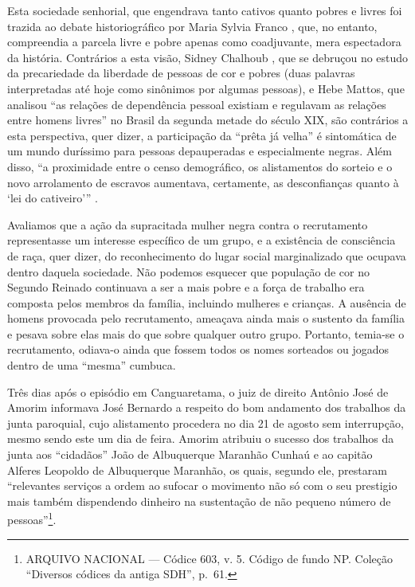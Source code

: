 \begin{refsection}
Esta sociedade senhorial, que engendrava tanto cativos quanto pobres e livres foi trazida ao debate historiográfico por Maria Sylvia Franco \citeyear{Franco1997}, que, no entanto, compreendia a parcela livre e pobre apenas como coadjuvante, mera espectadora da história. Contrários a esta visão, Sidney Chalhoub \citeyear{Chalhoub1990}, que se debruçou no estudo da precariedade da liberdade de pessoas de cor e pobres (duas palavras interpretadas até hoje como sinônimos por algumas pessoas), e Hebe Mattos, que analisou “as relações de dependência pessoal existiam e regulavam as relações entre homens livres” \cite[p.~89]{Mattos1987} no Brasil da segunda metade do século XIX, são contrários a esta perspectiva, quer dizer, a participação da “prêta já velha” é sintomática de um mundo duríssimo para pessoas depauperadas e especialmente negras. Além disso, “a proximidade entre o censo demográfico, os alistamentos do sorteio e o novo arrolamento de escravos aumentava, certamente, as desconfianças quanto à ‘lei do cativeiro’” \cite[p.~271]{Mendes1999}.

Avaliamos que a ação da supracitada mulher negra contra o recrutamento representasse um interesse específico de um grupo, e a existência de consciência de raça, quer dizer, do reconhecimento do lugar social marginalizado que ocupava dentro daquela sociedade. Não podemos esquecer que população de cor no Segundo Reinado continuava a ser a mais pobre e a força de trabalho era composta pelos membros da família, incluindo mulheres e crianças. A ausência de homens provocada pelo recrutamento, ameaçava ainda mais o sustento da família e pesava sobre elas mais do que sobre qualquer outro grupo. Portanto, temia-se o recrutamento, odiava-o ainda que fossem todos os nomes sorteados ou jogados dentro de uma “mesma” cumbuca.  

Três dias após o episódio em Canguaretama, o juiz de direito Antônio José de Amorim informava José Bernardo a respeito do bom andamento dos trabalhos da junta paroquial, cujo alistamento procedera no dia 21 de agosto sem interrupção, mesmo sendo este um dia de feira. Amorim atribuiu o sucesso dos trabalhos da junta aos “cidadãos” João de Albuquerque Maranhão Cunhaú e ao capitão Alferes Leopoldo de Albuquerque Maranhão, os quais, segundo ele, prestaram “relevantes serviços a ordem ao sufocar o movimento não só com o seu prestigio mais também dispendendo dinheiro na sustentação de não pequeno número de pessoas”\footnote{ARQUIVO NACIONAL --- Códice 603, v. 5. Código de fundo NP. Coleção “Diversos códices da antiga SDH”, p.~61.}.


\end{refsection}
